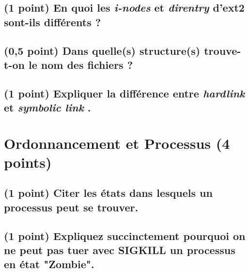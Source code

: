 \documentclass[11pt,a4paper]{article}
\begin{document}
\bigskip  %

\subsection{(1 point) En quoi les \textit{i-nodes} et \textit{direntry} d'ext2 sont-ils différents ?}

\bigskip
\bigskip
\bigskip  %
\bigskip  %
\bigskip
\bigskip

\subsection{(0,5 point) Dans quelle(s) structure(s) trouve-t-on le nom des fichiers ?}

\bigskip
\bigskip  %
\bigskip

\subsection{(1 point) Expliquer la différence entre \og \textit{hardlink} \fg et \og \textit{symbolic link} \fg.}

\bigskip
\bigskip  %
\bigskip  %
\bigskip
\bigskip
\bigskip


%
\section{Ordonnancement et Processus (4 points)}

\subsection{(1 point) Citer les états dans lesquels un processus peut se trouver.}

\bigskip
\bigskip  %
\bigskip

\subsection{(1 point) Expliquez succinctement pourquoi on ne peut pas tuer avec SIGKILL un processus en état "Zombie".}
\end{document}
